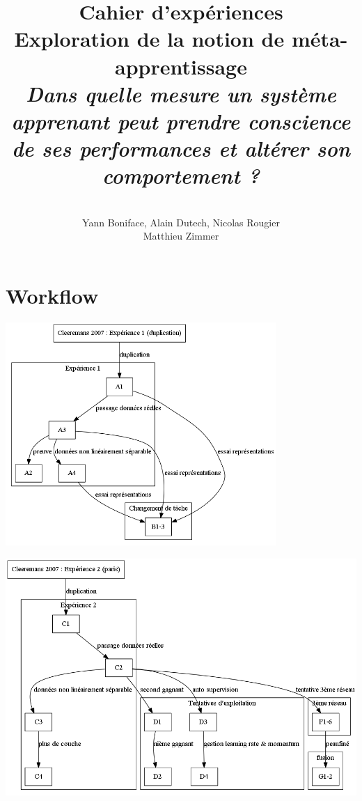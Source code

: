 \documentclass[a4paper,12pt]{article}
\title{
  \textbf{Cahier d'expériences}
  \\[5cm]
  Exploration de la notion de méta-apprentissage
  \\[3cm]
  \textit{
  Dans quelle mesure un système apprenant peut prendre conscience de ses performances
  et altérer son comportement ?}
}
\author{
  \\[3cm]
  Yann Boniface, Alain Dutech, Nicolas Rougier \\
  Matthieu Zimmer}
\begin{document}
  \maketitle
  \clearpage

  \tableofcontents

  \newpage
  \section{Workflow}
  \begin{center}
    \includegraphics[height=320px]{data/workflow2.png}
  \end{center}
  
  \hspace*{-1.9cm}
  \includegraphics[width=550px]{data/workflow3.png}
  
  
  
  
  
  
  
  
  
  
  
  
  
  
  
  
  
  
  
  
  
  
  
  
  
  
\end{document}
